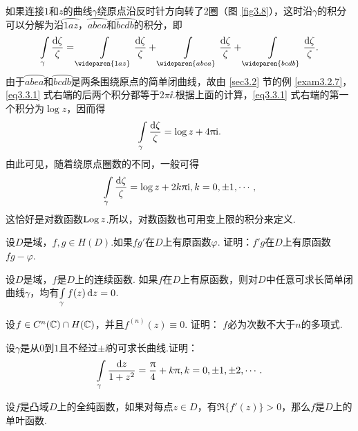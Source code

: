 \noindent 如果连接$1$和$z$的曲线$\gamma$绕原点沿反时针方向转了$2$圈（图 \ref{fig3.8}），这时沿$\gamma$的积分可以分解为沿$\wideparen{1az}$，$\wideparen{abea}$和$\wideparen{bcdb}$的积分，即
\begin{equation}\label{eq3.3.1}
  \int\limits_\gamma\frac{\dif \zeta}{\zeta}
  = \int\limits_{\wideparen{1az}}\frac{\dif \zeta}{\zeta} + \int\limits_{\wideparen{abea}}\frac{\dif \zeta}{\zeta}+\int\limits_{\wideparen{bcdb}}\frac{\dif \zeta}{\zeta}.
\end{equation}
由于$\wideparen{abea}$和$\wideparen{bcdb}$是两条围绕原点的简单闭曲线，故由 \ref{sec3.2} 节的例 \ref{exam3.2.7}，\eqref{eq3.3.1} 式右端的后两个积分都等于$2\pi\ii$.根据上面的计算，\eqref{eq3.3.1} 式右端的第一个积分为$\log z$，因而得
\[
  \int\limits_\gamma \frac{\mathop{}\!\mathrm{d} \zeta}\zeta = \log z + 4\uppi\mathrm i.
\]
由此可见，随着绕原点圈数的不同，一般可得
\[
  \int\limits_\gamma\frac{\mathop{}\!\mathrm{d} \zeta}\zeta = \log z+2k\uppi\mathrm i,k = 0,\pm1,\cdots,
\]
这恰好是对数函数$\operatorname{Log} z$.所以，对数函数也可用变上限的积分来定义.

\begin{xiti}
  \item 设$D$是域，$f,g\in H(D)$.如果$fg'$在$D$上有原函数$\varphi$. 证明：$f'g$在$D$上有原函数$fg-\varphi$.
  \item 设$D$是域，$f$是$D$上的连续函数. 如果$f$在$D$上有原函数，则对$D$中任意可求长简单闭曲线$\gamma$，均有$\int\limits_\gamma f(z)\mathop{}\!\mathrm dz=0$.
  \item 设$f\in C^n(\mathbb C)\cap H(\mathbb C)$，并且$f^{(n)}(z)\equiv0$. 证明： $f$必为次数不大于$n$的多项式.
  \item 设$\gamma$是从$0$到$1$且不经过$\pm\ii$的可求长曲线.证明：
    \[
      \int\limits_\gamma\frac{\mathop{}\!\mathrm dz}{1+z^2} = \frac{\uppi}4 + k\uppi,k = 0,\pm1,\pm2,\cdots.
    \]
  \item 设$f$是凸域$D$上的全纯函数，如果对每点$z\in D$，有$\Re \{f'(z)\}>0$，那么$f$是$D$上的单叶函数.
\end{xiti}

